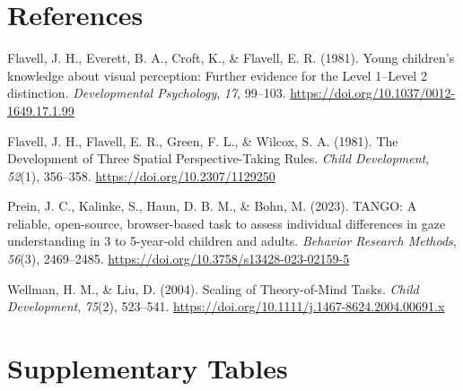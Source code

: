 \documentclass[
  man,floatsintext]{apa7}
\newlength{\cslhangindent}
\newenvironment{CSLReferences}[2] %
 {\begin{list}{}{%
  \setlength{\itemindent}{0pt}
  \setlength{\leftmargin}{0pt}
  \setlength{\parsep}{0pt}
  \ifodd #1
   \setlength{\leftmargin}{\cslhangindent}
   \setlength{\itemindent}{-1\cslhangindent}
  \fi
  \setlength{\itemsep}{#2\baselineskip}}}
 {\end{list}}
\begin{document}
\newpage

\section{References}\label{references}

\begingroup
\setlength{\parindent}{-0.5in}
\setlength{\leftskip}{0.5in}

\label{refs}
\begin{CSLReferences}{1}{0}
Flavell, J. H., Everett, B. A., Croft, K., \& Flavell, E. R. (1981). Young children's knowledge about visual perception: {Further} evidence for the {Level} 1--{Level} 2 distinction. \emph{Developmental Psychology}, \emph{17}, 99--103. \url{https://doi.org/10.1037/0012-1649.17.1.99}

Flavell, J. H., Flavell, E. R., Green, F. L., \& Wilcox, S. A. (1981). The {Development} of {Three Spatial Perspective-Taking Rules}. \emph{Child Development}, \emph{52}(1), 356--358. \url{https://doi.org/10.2307/1129250}

Prein, J. C., Kalinke, S., Haun, D. B. M., \& Bohn, M. (2023). {TANGO}: {A} reliable, open-source, browser-based task to assess individual differences in gaze understanding in 3 to 5-year-old children and adults. \emph{Behavior Research Methods}, \emph{56}(3), 2469--2485. \url{https://doi.org/10.3758/s13428-023-02159-5}

Wellman, H. M., \& Liu, D. (2004). Scaling of {Theory-of-Mind Tasks}. \emph{Child Development}, \emph{75}(2), 523--541. \url{https://doi.org/10.1111/j.1467-8624.2004.00691.x}

\end{CSLReferences}

\endgroup

\newpage

\section{Supplementary Tables}\label{supplementary-tables}
\end{document}

